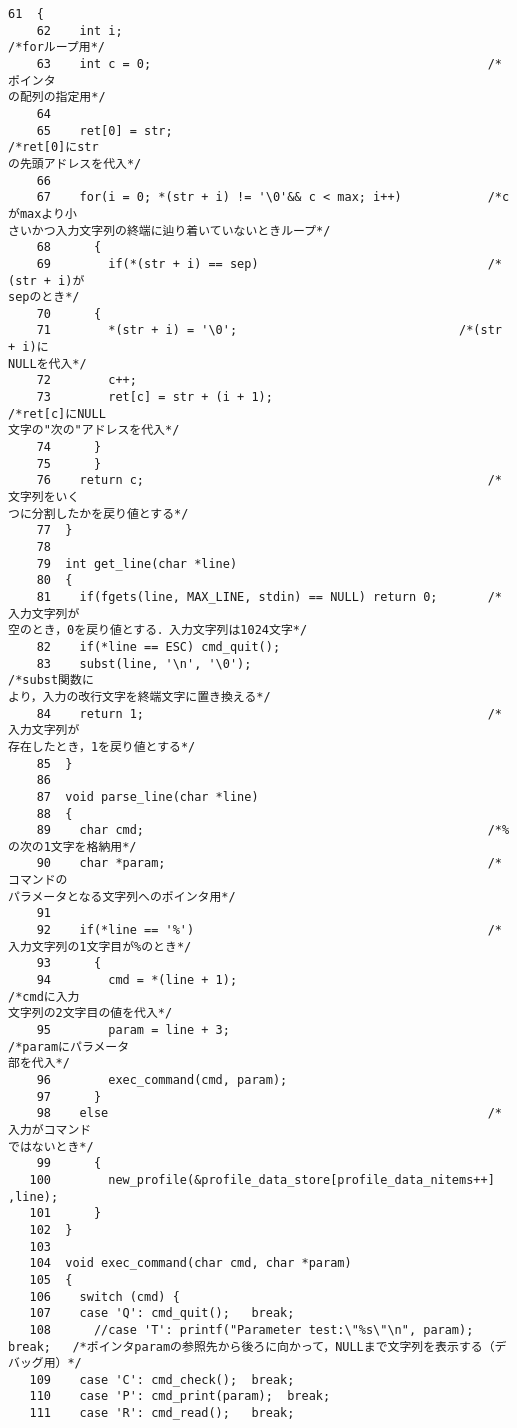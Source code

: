 \begin{Verbatim}[fontsize=\small, baselinestretch=0.8]
    61	{
    62	  int i;                                                   /*forループ用*/
    63	  int c = 0;                                               /*ポインタ
の配列の指定用*/
    64	
    65	  ret[0] = str;                                            /*ret[0]にstr
の先頭アドレスを代入*/
    66	
    67	  for(i = 0; *(str + i) != '\0'&& c < max; i++)            /*cがmaxより小
さいかつ入力文字列の終端に辿り着いていないときループ*/
    68	    {
    69	      if(*(str + i) == sep)                                /*(str + i)が
sepのとき*/
    70		{
    71		  *(str + i) = '\0';                               /*(str + i)に
NULLを代入*/
    72		  c++;
    73		  ret[c] = str + (i + 1);                          /*ret[c]にNULL
文字の"次の"アドレスを代入*/
    74		}
    75	    }
    76	  return c;                                                /*文字列をいく
つに分割したかを戻り値とする*/
    77	}
    78	
    79	int get_line(char *line)
    80	{
    81	  if(fgets(line, MAX_LINE, stdin) == NULL) return 0;       /*入力文字列が
空のとき，0を戻り値とする．入力文字列は1024文字*/
    82	  if(*line == ESC) cmd_quit();
    83	  subst(line, '\n', '\0');                                 /*subst関数に
より，入力の改行文字を終端文字に置き換える*/
    84	  return 1;                                                /*入力文字列が
存在したとき，1を戻り値とする*/
    85	}
    86	
    87	void parse_line(char *line)
    88	{
    89	  char cmd;                                                /*%の次の1文字を格納用*/
    90	  char *param;                                             /*コマンドの
パラメータとなる文字列へのポインタ用*/
    91	
    92	  if(*line == '%')                                         /*入力文字列の1文字目が%のとき*/
    93	    {
    94	      cmd = *(line + 1);                                   /*cmdに入力
文字列の2文字目の値を代入*/
    95	      param = line + 3;                                    /*paramにパラメータ
部を代入*/
    96	      exec_command(cmd, param);
    97	    }
    98	  else                                                     /*入力がコマンド
ではないとき*/
    99	    {
   100	      new_profile(&profile_data_store[profile_data_nitems++] ,line);
   101	    }
   102	}
   103	
   104	void exec_command(char cmd, char *param)
   105	{
   106	  switch (cmd) {
   107	  case 'Q': cmd_quit();   break;
   108	    //case 'T': printf("Parameter test:\"%s\"\n", param); break;   /*ポインタparamの参照先から後ろに向かって，NULLまで文字列を表示する（デバッグ用）*/
   109	  case 'C': cmd_check();  break;
   110	  case 'P': cmd_print(param);  break;
   111	  case 'R': cmd_read();   break;

\end{Verbatim}
